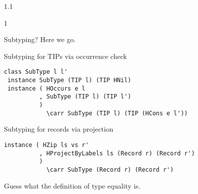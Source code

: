\documentclass{slides}
\newenvironment{myslide}{\begin{slide}\color{Blue}\begin{boxedminipage}{1.1\hsize}\begin{boxedminipage}{1\hsize}\color{Black}
\vspace{-170\in}
}{%
\smallskip
\end{boxedminipage}
\end{boxedminipage}
\end{slide}}
\newenvironment{myslide}{\begin{slide}
}{%
\end{slide}}
\newenvironment{myslide}{\begin{slide}\color{White}\begin{boxedminipage}{1.1\hsize}\color{Black}
\vspace{-170\in}
}{%
\smallskip
\end{boxedminipage}
\end{slide}}
\newcommand{\header}[1]{{\large \color{Red} #1}}
\newcommand{\blau}[1]{{\vspace{-50\in}\normalsize \color{Blue} #1}}
\newcommand{\carr}{\ensuremath{\Rightarrow}}
\begin{document}
\begin{myslide}

\header{Subtyping? Here we go.}

\vspace{-77\in}

\blau{Subtyping for TIPs via occurrence check}

\smallskip

\begin{Verbatim}[fontfamily=courier,fontsize=\tiny,commandchars=\\\{\}]
 class SubType l l'
 instance SubType (TIP l) (TIP HNil)
 instance ( HOccurs e l
          , SubType (TIP l) (TIP l')
          )
            \carr SubType (TIP l) (TIP (HCons e l'))
\end{Verbatim}

\vspace{-77\in}

\blau{Subtyping for records via projection}

\smallskip

\begin{Verbatim}[fontfamily=courier,fontsize=\tiny,commandchars=\\\{\}]
 instance ( HZip ls vs r'
          , HProjectByLabels ls (Record r) (Record r')
          )
            \carr SubType (Record r) (Record r')
\end{Verbatim}

{\small

Guess what the definition of type equality is.

}

\end{myslide}



\end{document}
